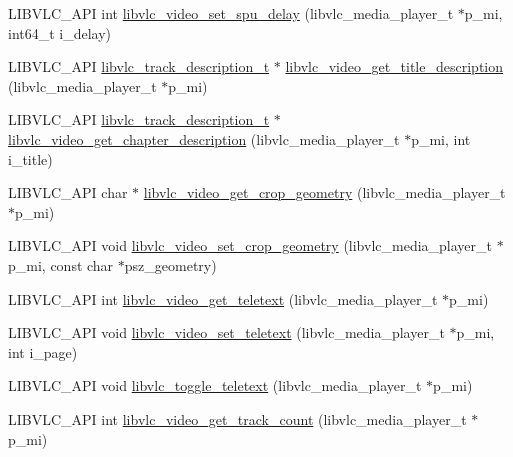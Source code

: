 \begin{DoxyCompactItemize}
\item 
L\+I\+B\+V\+L\+C\+\_\+\+A\+PI int \hyperlink{group__libvlc__video_ga98a515c9a91f3ac322fc720ac301f985}{libvlc\+\_\+video\+\_\+set\+\_\+spu\+\_\+delay} (libvlc\+\_\+media\+\_\+player\+\_\+t $\ast$p\+\_\+mi, int64\+\_\+t i\+\_\+delay)
\item 
L\+I\+B\+V\+L\+C\+\_\+\+A\+PI \hyperlink{structlibvlc__track__description__t}{libvlc\+\_\+track\+\_\+description\+\_\+t} $\ast$ \hyperlink{group__libvlc__video_gad14d920e740c5f6ba378b7b6124ece94}{libvlc\+\_\+video\+\_\+get\+\_\+title\+\_\+description} (libvlc\+\_\+media\+\_\+player\+\_\+t $\ast$p\+\_\+mi)
\item 
L\+I\+B\+V\+L\+C\+\_\+\+A\+PI \hyperlink{structlibvlc__track__description__t}{libvlc\+\_\+track\+\_\+description\+\_\+t} $\ast$ \hyperlink{group__libvlc__video_ga152487c73035d2b9a69aa7b41764c029}{libvlc\+\_\+video\+\_\+get\+\_\+chapter\+\_\+description} (libvlc\+\_\+media\+\_\+player\+\_\+t $\ast$p\+\_\+mi, int i\+\_\+title)
\item 
L\+I\+B\+V\+L\+C\+\_\+\+A\+PI char $\ast$ \hyperlink{group__libvlc__video_gab8cd91facb516fd12fec882605a78aa1}{libvlc\+\_\+video\+\_\+get\+\_\+crop\+\_\+geometry} (libvlc\+\_\+media\+\_\+player\+\_\+t $\ast$p\+\_\+mi)
\item 
L\+I\+B\+V\+L\+C\+\_\+\+A\+PI void \hyperlink{group__libvlc__video_ga3547297d885a8820a85cefc82f1c0b2e}{libvlc\+\_\+video\+\_\+set\+\_\+crop\+\_\+geometry} (libvlc\+\_\+media\+\_\+player\+\_\+t $\ast$p\+\_\+mi, const char $\ast$psz\+\_\+geometry)
\item 
L\+I\+B\+V\+L\+C\+\_\+\+A\+PI int \hyperlink{group__libvlc__video_ga826fb9efaf5275574373763dfc915f4c}{libvlc\+\_\+video\+\_\+get\+\_\+teletext} (libvlc\+\_\+media\+\_\+player\+\_\+t $\ast$p\+\_\+mi)
\item 
L\+I\+B\+V\+L\+C\+\_\+\+A\+PI void \hyperlink{group__libvlc__video_gac734df7211ebf2a80d09d2566c96240b}{libvlc\+\_\+video\+\_\+set\+\_\+teletext} (libvlc\+\_\+media\+\_\+player\+\_\+t $\ast$p\+\_\+mi, int i\+\_\+page)
\item 
L\+I\+B\+V\+L\+C\+\_\+\+A\+PI void \hyperlink{group__libvlc__video_ga3ae3e07b4b1c9238e5526f3a3e453543}{libvlc\+\_\+toggle\+\_\+teletext} (libvlc\+\_\+media\+\_\+player\+\_\+t $\ast$p\+\_\+mi)
\item 
L\+I\+B\+V\+L\+C\+\_\+\+A\+PI int \hyperlink{group__libvlc__video_ga07728229ba21bd8247fc191a59e6fc8c}{libvlc\+\_\+video\+\_\+get\+\_\+track\+\_\+count} (libvlc\+\_\+media\+\_\+player\+\_\+t $\ast$p\+\_\+mi)
\item 

\end{DoxyCompactItemize}
